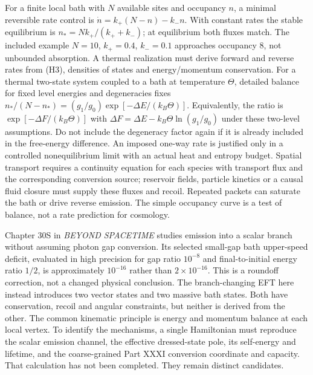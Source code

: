 \documentclass[
  11pt,
  twoside]{article}
\begin{document}
For a finite local bath with \(N\) available sites and occupancy \(n\),
a minimal reversible rate control is \(\dot n=k_+(N-n)-k_-n\). With
constant rates the stable equilibrium is \(n_*=Nk_+/(k_++k_-)\); at
equilibrium both fluxes match. The included example \(N=10\),
\(k_+=0.4\), \(k_-=0.1\) approaches occupancy 8, not unbounded
absorption. A thermal realization must derive forward and reverse rates
from (H3), densities of states and energy/momentum conservation. For a
thermal two-state system coupled to a bath at temperature \(\Theta\),
detailed balance for fixed level energies and degeneracies fixes
\(n_*/(N-n_*)=(g_1/g_0)\exp[-\Delta E/(k_B\Theta)]\). Equivalently, the
ratio is \(\exp[-\Delta F/(k_B\Theta)]\) with
\(\Delta F=\Delta E-k_B\Theta\ln(g_1/g_0)\) under these two-level
assumptions. Do not include the degeneracy factor again if it is already
included in the free-energy difference. An imposed one-way rate is
justified only in a controlled nonequilibrium limit with an actual heat
and entropy budget. Spatial transport requires a continuity equation for
each species with transport flux and the corresponding conversion
source; reservoir fields, particle kinetics or a causal fluid closure
must supply these fluxes and recoil. Repeated packets can saturate the
bath or drive reverse emission. The simple occupancy curve is a test of
balance, not a rate prediction for cosmology.

Chapter 30S in \emph{BEYOND SPACETIME} studies emission into a scalar
branch without assuming photon gap conversion. Its selected small-gap
bath upper-speed deficit, evaluated in high precision for gap ratio
\(10^{-8}\) and final-to-initial energy ratio \(1/2\), is approximately
\(10^{-16}\) rather than \(2\times10^{-16}\). This is a roundoff
correction, not a changed physical conclusion. The branch-changing EFT
here instead introduces two vector states and two massive bath states.
Both have conservation, recoil and angular constraints, but neither is
derived from the other. The common kinematic principle is energy and
momentum balance at each local vertex. To identify the mechanisms, a
single Hamiltonian must reproduce the scalar emission channel, the
effective dressed-state pole, its self-energy and lifetime, and the
coarse-grained Part XXXI conversion coordinate and capacity. That
calculation has not been completed. They remain distinct candidates.
\end{document}
